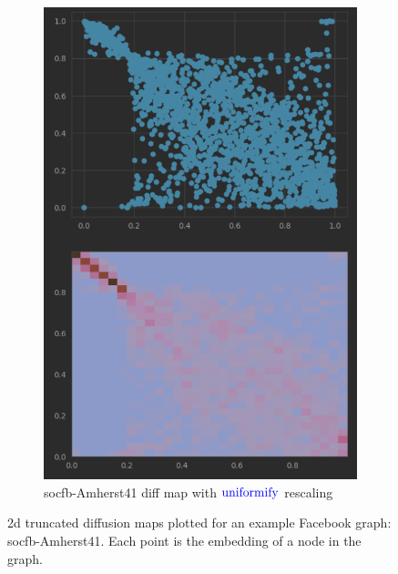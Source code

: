 \begin{figure}
\begin{subfigure}{0.45\textwidth}
      \includegraphics[width=\linewidth]{figures/real_diffmap_plot_uniformed.png}
      \caption{socfb-Amherst41 diff map with $\operatorname{\textcolor{blue}{uniformify}}$ rescaling}
      \label{fig:sub4}
    \end{subfigure}
    \caption{
      2d truncated diffusion maps plotted for an example Facebook graph: socfb-Amherst41. Each point is the embedding of a node in the graph.}
    \label{fig:diffmap_uniformed_vs_nonuniformed2}
\end{figure}



